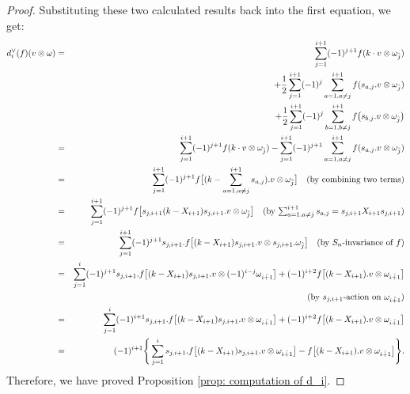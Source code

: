 \documentclass[11pt]{amsart}
\numberwithin{equation}{section}
\theoremstyle{definition}
\begin{document}
\begin{proof}
Substituting these two calculated results back into the first equation, we get:
\begin{eqnarray*}
    d_{i}^{\vee}(f)(v\otimes\omega)
    &=&\sum_{j=1}^{i+1} (-1)^{j+1}f(k\cdot v\otimes\omega_{\hat{j}})\\
    &&+\frac{1}{2}\sum_{j=1}^{i+1}(-1)^{j}\sum_{a=1,a\neq j}^{i+1}f(s_{a,j}.v\otimes\omega_{\hat{j}})\\
    &&+\frac{1}{2}\sum_{j=1}^{i+1}(-1)^{j} \sum_{b=1,b\neq j}^{i+1}f\big(s_{b,j}.v\otimes \omega_{\hat{j}}\big)\\
    &=&\sum_{j=1}^{i+1} (-1)^{j+1}f(k\cdot v\otimes\omega_{\hat{j}})-\sum_{j=1}^{i+1}(-1)^{j+1}\sum_{a=1,a\neq j}^{i+1}f(s_{a,j}.v\otimes\omega_{\hat{j}})\\
    &=&\sum_{j=1}^{i+1} (-1)^{j+1}f\big[(k-\sum_{a=1,a\neq j}^{i+1}s_{a,j}).v\otimes\omega_{\hat{j}} \big]  \quad \mbox{(by combining two terms)} \\
    &=&\sum_{j=1}^{i+1} (-1)^{j+1}f\big[s_{j,i+1}(k-X_{i+1})s_{j,i+1}.v\otimes\omega_{\hat{j}} \big] \quad \mbox{(by $ \sum_{a=1, a\neq j}^{i+1}s_{a,  j} =s_{j,i+1}X_{i+1}s_{j,i+1}$)}\\
    &=&\sum_{j=1}^{i+1} (-1)^{j+1}s_{j,i+1}.f\big[(k-X_{i+1})s_{j,i+1}.v\otimes s_{j,i+1}.\omega_{\hat{j}} \big]   \quad \mbox{(by $S_n$-invariance of $f$)} \\
    &=&\sum_{j=1}^{i} (-1)^{j+1}s_{j,i+1}.f\big[(k-X_{i+1})s_{j,i+1}.v\otimes (-1)^{i-j}\omega_{\hat{i+1}} \big]+(-1)^{i+2}f\big[(k-X_{i+1}).v\otimes\omega_{\hat{i+1}}\big]\\
    & &  \quad \ \quad \ \quad \mbox{(by $s_{j,i+1}$-action on $\omega_{\hat{i+1}}$)} \\
    &=&\sum_{j=1}^{i} (-1)^{i+1}s_{j,i+1}.f\big[(k-X_{i+1})s_{j,i+1}.v\otimes\omega_{\hat{i+1}} \big]+(-1)^{i+2}f\big[(k-X_{i+1}).v\otimes\omega_{\hat{i+1}}\big]\\
    &=&(-1)^{i+1}\Bigg\{\sum_{j=1}^{i} s_{j,i+1}.f\big[(k-X_{i+1})s_{j,i+1}.v\otimes\omega_{\hat{i+1}} \big]-f\big[(k-X_{i+1}).v\otimes\omega_{\hat{i+1}}\big]\Bigg\} .
\end{eqnarray*}
Therefore, we have proved Proposition \ref{prop: computation of d_i}.
\end{proof}
\end{document}
